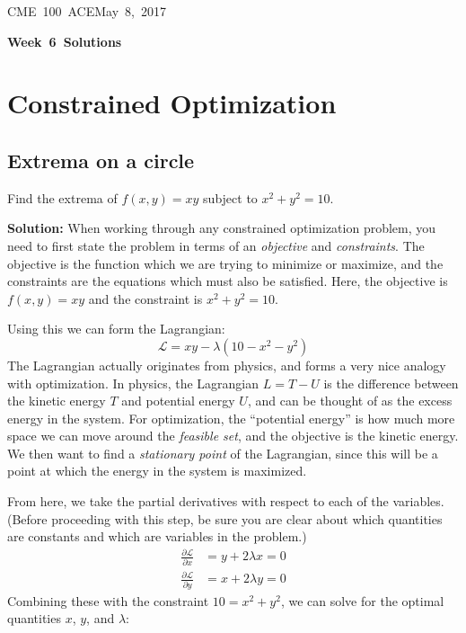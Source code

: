 \documentclass[letterpaper, 11pt]{article}
\makeatletter
\newcommand{\hmwkTitle}{Week\ 6\ Solutions} %
\newcommand{\hmwkClass}{CME\ 100\ ACE} %
\newcommand{\hmwkAuthorName}{Timothy Anderson} %
\newcommand{\hmwkAuthorEmail}{timmya@stanford.edu} %
\makeatother
\begin{document}
\noindent
\normalsize 
\hmwkClass \hfill May\ 8,\ 2017\\

\begin{center} \Large \textbf{\hmwkTitle} \end{center}

\section{Constrained Optimization}
\subsection{Extrema on a circle} Find the extrema of $f(x,y) = xy$ subject to $x^2 + y^2 = 10$. 
\par \textbf{Solution:} When working through any constrained optimization problem, you need to first state the problem in terms of an \textit{objective} and \textit{constraints}. The objective is the function which we are trying to minimize or maximize, and the constraints are the equations which must also be satisfied. Here, the objective is $f(x,y) = xy$ and the constraint is $x^2 + y^2 = 10$. 
\par Using this we can form the Lagrangian:
\[ \mathcal{L} = xy - \lambda(10 - x^2 - y^2) \]
The Lagrangian actually originates from physics, and forms a very nice analogy with optimization. In physics, the Lagrangian $L = T - U$ is the difference between the kinetic energy $T$ and potential energy $U$, and can be thought of as the excess energy in the system. For optimization, the ``potential energy'' is how much more space we can move around the \textit{feasible set}, and the objective is the kinetic energy. We then want to find a \textit{stationary point} of the Lagrangian, since this will be a point at which the energy in the system is maximized. 
\par From here, we take the partial derivatives with respect to each of the variables. (Before proceeding with this step, be sure you are clear about which quantities are constants and which are variables in the problem.)
\begin{align*}
\frac{\partial \mathcal{L}}{\partial x} &= y + 2\lambda x = 0\\
\frac{\partial \mathcal{L}}{\partial y} &= x + 2 \lambda y = 0
\end{align*}
Combining these with the constraint $10 = x^2 + y^2$, we can solve for the optimal quantities $x$, $y$, and $\lambda$:
\end{document}
